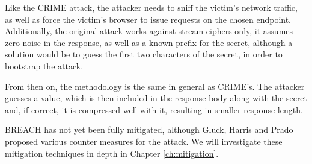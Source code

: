 Like the CRIME attack, the attacker needs to sniff the victim's network traffic,
as well as force the victim's browser to issue requests on the chosen endpoint.
Additionally, the original attack works against stream ciphers only, it assumes
zero noise in the response, as well as a known prefix for the secret, although a
solution would be to guess the first two characters of the secret, in order to
bootstrap the attack.

From then on, the methodology is the same in general as CRIME's. The attacker
guesses a value, which is then included in the response body along with the
secret and, if correct, it is compressed well with it, resulting in smaller
response length.

BREACH has not yet been fully mitigated, although Gluck, Harris and Prado
proposed various counter measures for the attack. We will investigate these
mitigation techniques in depth in Chapter \ref{ch:mitigation}.
